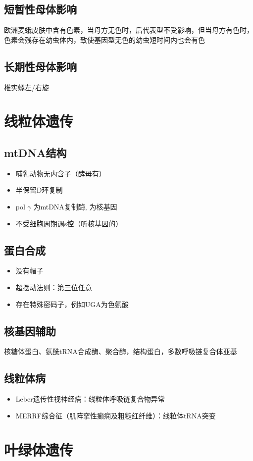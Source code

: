 \documentclass[a4paper, 12pt]{report}
\begin{document}
  \subsection{短暂性母体影响}
  欧洲麦蛾皮肤中含有色素，当母方无色时，后代表型不受影响，但当母方有色时，色素会残存在幼虫体内，致使基因型无色的幼虫短时间内也会有色
  \subsection{长期性母体影响}
  椎实螺左/右旋
  \section{线粒体遗传}
  \subsection{mtDNA结构}
  \begin{itemize}
    \item 哺乳动物无内含子（酵母有）
    \item 半保留D环复制
    \item pol \(\gamma\) 为mtDNA复制酶, 为核基因
    \item 不受细胞周期调s控（听核基因的）
  \end{itemize}
  \subsection{蛋白合成}
  \begin{itemize}
    \item 没有帽子
    \item 超摆动法则：第三位任意
    \item 存在特殊密码子，例如UGA为色氨酸
  \end{itemize}
  \subsection{核基因辅助}
  核糖体蛋白、氨酰tRNA合成酶、聚合酶，结构蛋白，多数呼吸链复合体亚基
  \subsection{线粒体病}
  \begin{itemize}
    \item Leber遗传性视神经病：线粒体呼吸链复合物异常
    \item MERRF综合征（肌阵挛性癫痫及粗糙红纤维）：线粒体tRNA突变
  \end{itemize}
  \section{叶绿体遗传}
\end{document}
